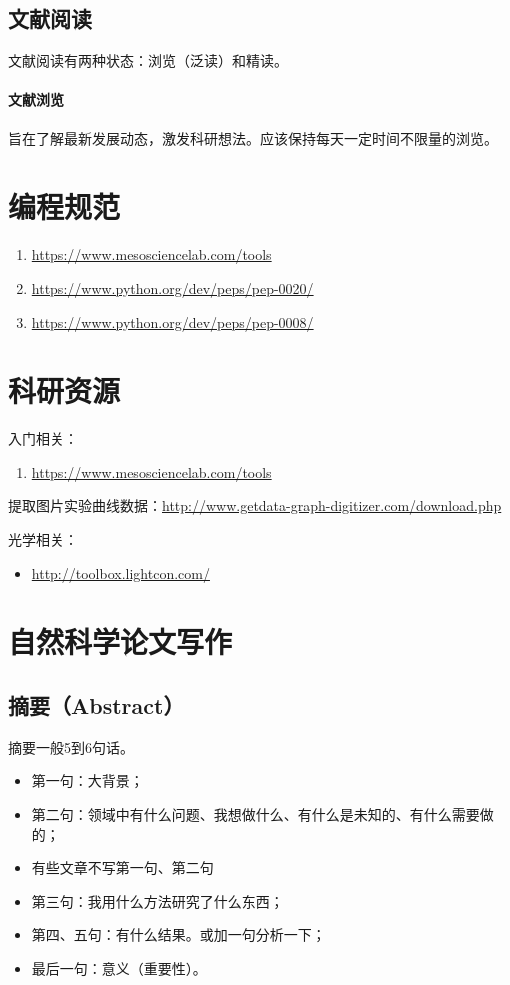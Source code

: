 \subsection{文献阅读}
文献阅读有两种状态：浏览（泛读）和精读。

\paragraph{文献浏览}旨在了解最新发展动态，激发科研想法。应该保持每天一定时间不限量的浏览。



\section{编程规范}
\begin{enumerate}
\item \url{https://www.mesosciencelab.com/tools}

\item \url{https://www.python.org/dev/peps/pep-0020/}

\item \url{https://www.python.org/dev/peps/pep-0008/}
\end{enumerate}



\section{科研资源}
入门相关：
\begin{enumerate}
\item \url{https://www.mesosciencelab.com/tools}
\end{enumerate}


提取图片实验曲线数据：\url{http://www.getdata-graph-digitizer.com/download.php}

光学相关：
 \begin{itemize}
\item \url{http://toolbox.lightcon.com/}
\end{itemize}


\section{自然科学论文写作}
\subsection{摘要（Abstract）}
摘要一般5到6句话。
\begin{itemize}
\item 第一句：大背景；
\item 第二句：领域中有什么问题、我想做什么、有什么是未知的、有什么需要做的；
\item 有些文章不写第一句、第二句
\item 第三句：我用什么方法研究了什么东西；
\item 第四、五句：有什么结果。或加一句分析一下；
\item 最后一句：意义（重要性）。
\end{itemize}


